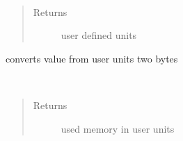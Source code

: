 \documentclass[letterpaper,10pt,english]{sphinxmanual}
\begin{document}
\begin{fulllineitems}

\begin{fulllineitems}
\label{RRtoolbox.lib:RRtoolbox.lib.cache.resourceManager.unit}~\begin{quote}\begin{description}
\item[{Returns}] \leavevmode
user defined units

\end{description}\end{quote}

\end{fulllineitems}


\begin{fulllineitems}
\label{RRtoolbox.lib:RRtoolbox.lib.cache.resourceManager.units2bytes}
converts value from user units two bytes

\end{fulllineitems}


\begin{fulllineitems}
\label{RRtoolbox.lib:RRtoolbox.lib.cache.resourceManager.usedMemory}~\begin{quote}\begin{description}
\item[{Returns}] \leavevmode
used memory in user units

\end{description}\end{quote}

\end{fulllineitems}


\end{fulllineitems}

\end{document}

